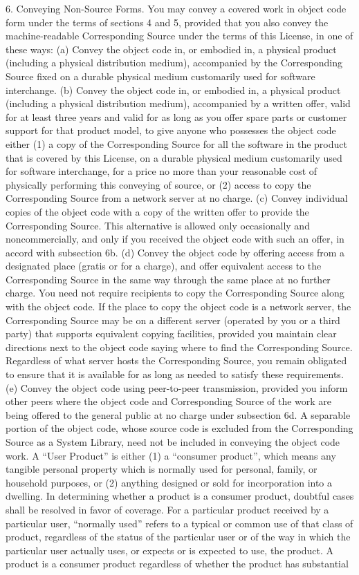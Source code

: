 \documentclass {book}
\begin{document}
\begin{tiny}
6. Conveying Non-Source Forms. You may convey a covered work in object code form under the terms of sections 4 and 5, provided that you also convey the machine-readable Corresponding Source under the terms of this License, in one of these ways: (a) Convey the object code in, or embodied in, a physical product (including a physical distribution medium), accompanied by the Corresponding Source fixed on a durable physical medium customarily used for software interchange. (b) Convey the object code in, or embodied in, a physical product (including a physical distribution medium), accompanied by a written offer, valid for at least three years and valid for as long as you offer spare parts or customer support for that product model, to give anyone who possesses the object code either (1) a copy of the Corresponding Source for all the software in the product that is covered by this License, on a durable physical medium customarily used for software interchange, for a price no more than your reasonable cost of physically performing this conveying of source, or (2) access to copy the Corresponding Source from a network server at no charge. (c) Convey individual copies of the object code with a copy of the written offer to provide the Corresponding Source. This alternative is allowed only occasionally and noncommercially, and only if you received the object code with such an offer, in accord with subsection 6b. (d) Convey the object code by offering access from a designated place (gratis or for a charge), and offer equivalent access to the Corresponding Source in the same way through the same place at no further charge. You need not require recipients to copy the Corresponding Source along with the object code. If the place to copy the object code is a network server, the Corresponding Source may be on a different server (operated by you or a third party) that supports equivalent copying facilities, provided you maintain clear directions next to the object code saying where to find the Corresponding Source. Regardless of what server hosts the Corresponding Source, you remain obligated to ensure that it is available for as long as needed to satisfy these requirements. (e) Convey the object code using peer-to-peer transmission, provided you inform other peers where the object code and Corresponding Source of the work are being offered to the general public at no charge under subsection 6d. A separable portion of the object code, whose source code is excluded from the Corresponding Source as a System Library, need not be included in conveying the object code work. A ``User Product'' is either (1) a ``consumer product'', which means any tangible personal property which is normally used for personal, family, or household purposes, or (2) anything designed or sold for incorporation into a dwelling. In determining whether a product is a consumer product, doubtful cases shall be resolved in favor of coverage. For a particular product received by a particular user, ``normally used'' refers to a typical or common use of that class of product, regardless of the status of the particular user or of the way in which the particular user actually uses, or expects or is expected to use, the product. A product is a consumer product regardless of whether the product has substantial 
\end{tiny}
\end{document}
